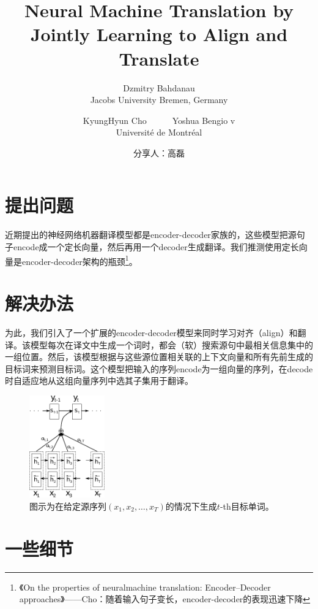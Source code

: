 \documentclass[a4paper,UTF8,no-math]{ctexart}
\title{Neural Machine Translation  by Jointly Learning to Align and Translate}
\author{
	Dzmitry Bahdanau \\
	Jacobs University Bremen, Germany
	\and
	KyungHyun Cho~ ~ ~ ~Yoshua Bengio  v  \\
	Universit\'{e} de Montr\'{e}al
}
\date{分享人：高磊 \\ \zhtoday}
\begin{document}
	
	
	\maketitle
	
	
	\section{提出问题}
	
	近期提出的神经网络机器翻译模型都是encoder-decoder家族的，这些模型把源句子encode成一个定长向量，然后再用一个decoder生成翻译。我们推测使用定长向量是encoder-decoder架构的瓶颈\footnote{《On the properties of neuralmachine translation: Encoder–Decoder approaches》——Cho：随着输入句子变长，encoder-decoder的表现迅速下降}。
	
	
	
	
	\section{解决办法}
	
	
	为此，我们引入了一个扩展的encoder-decoder模型来同时学习对齐（align）和翻译。该模型每次在译文中生成一个词时，都会（软）搜索源句中最相关信息集中的一组位置。然后，该模型根据与这些源位置相关联的上下文向量和所有先前生成的目标词来预测目标词。这个模型把输入的序列encode为一组向量的序列，在decode时自适应地从这组向量序列中选其子集用于翻译。
	
	\begin{figure}
		\centering
		\includegraphics[width=0.29\textwidth]{./images/AttentionMechanism/rnnsearch.pdf}
		\caption{
			图示为在给定源序列$(x_1, x_2,\dots, x_T)$的情况下生成$t$-th目标单词。
		}
		\label{fig:rnnsearch}
	\end{figure}

	\section{一些细节}
	
\end{document}
